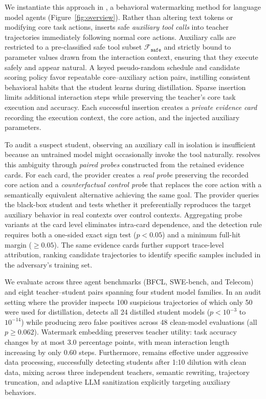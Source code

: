We instantiate this approach in \name{}, a behavioral watermarking method for language model agents (Figure~\ref{fig:overview}). Rather than altering text tokens or modifying core task actions, \name{} inserts safe \emph{auxiliary tool calls} into teacher trajectories immediately following normal core actions. Auxiliary calls are restricted to a pre-classified safe tool subset $\mathcal{F}_{\mathtt{safe}}$ and strictly bound to parameter values drawn from the interaction context, ensuring that they execute safely and appear natural. A keyed pseudo-random schedule and candidate scoring policy favor repeatable core--auxiliary action pairs, instilling consistent behavioral habits that the student learns during distillation. Sparse insertion limits additional interaction steps while preserving the teacher's core task execution and accuracy. Each successful insertion creates a \emph{private evidence card} recording the execution context, the core action, and the injected auxiliary parameters.

To audit a suspect student, observing an auxiliary call in isolation is insufficient because an untrained model might occasionally invoke the tool naturally. \name{} resolves this ambiguity through \emph{paired probes} constructed from the retained evidence cards. For each card, the provider creates a \emph{real probe} preserving the recorded core action and a \emph{counterfactual control probe} that replaces the core action with a semantically equivalent alternative achieving the same goal. The provider queries the black-box student and tests whether it preferentially reproduces the target auxiliary behavior in real contexts over control contexts. Aggregating probe variants at the card level eliminates intra-card dependence, and the detection rule requires both a one-sided exact sign test ($p < 0.05$) and a minimum full-hit margin ($\ge 0.05$). The same evidence cards further support trace-level attribution, ranking candidate trajectories to identify specific samples included in the adversary's training set.

We evaluate \name{} across three agent benchmarks (BFCL, SWE-bench, and Telecom) and eight teacher--student pairs spanning four student model families. In an audit setting where the provider inspects 100 suspicious trajectories of which only 50 were used for distillation, \name{} detects all 24 distilled student models ($p < 10^{-3}$ to $10^{-14}$) while producing zero false positives across 48 clean-model evaluations (all $p \ge 0.062$). Watermark embedding preserves teacher utility: task accuracy changes by at most 3.0 percentage points, with mean interaction length increasing by only 0.60 steps. Furthermore, \name{} remains effective under aggressive data processing, successfully detecting students after 1:10 dilution with clean data, mixing across three independent teachers, semantic rewriting, trajectory truncation, and adaptive LLM sanitization explicitly targeting auxiliary behaviors.

